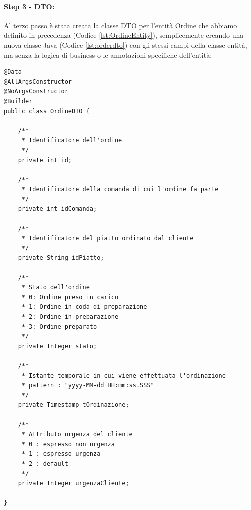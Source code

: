 \paragraph{Step 3 - DTO:}
Al terzo passo è stata creata la classe DTO per l'entità Ordine che abbiamo definito in precedenza (Codice \vref{lst:OrdineEntity}), semplicemente creando una nuova classe Java (Codice \vref{lst:orderdto}) con gli stessi campi della classe entità, ma senza la logica di business o le annotazioni specifiche dell'entità:
\begin{lstlisting}[style=myJava, 
    caption={Classe DTO per l'entità ordine OrderDTO.java}, label=lst:orderdto, 
    emph={[2] urgenzaCliente, id, idComanda, idPiatto, stato, tOrdinazione },
    emphstyle={[2]\color{codeDarkMagenta}},]
@Data
@AllArgsConstructor
@NoArgsConstructor
@Builder
public class OrdineDTO {

    /**
     * Identificatore dell'ordine
     */
    private int id;

    /**
     * Identificatore della comanda di cui l'ordine fa parte
     */
    private int idComanda;

    /**
     * Identificatore del piatto ordinato dal cliente
     */
    private String idPiatto;

    /**
     * Stato dell'ordine
     * 0: Ordine preso in carico
     * 1: Ordine in coda di preparazione
     * 2: Ordine in preparazione
     * 3: Ordine preparato
     */
    private Integer stato;

    /**
     * Istante temporale in cui viene effettuata l'ordinazione
     * pattern : "yyyy-MM-dd HH:mm:ss.SSS"
     */
    private Timestamp tOrdinazione;

    /**
     * Attributo urgenza del cliente
     * 0 : espresso non urgenza
     * 1 : espresso urgenza
     * 2 : default
     */
    private Integer urgenzaCliente;

}
\end{lstlisting}
